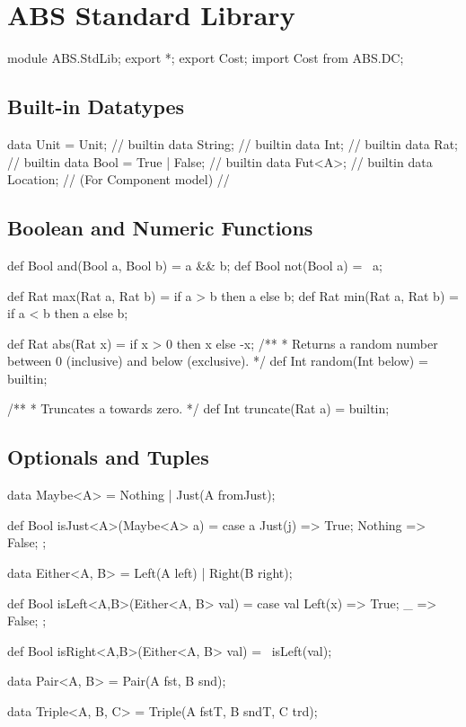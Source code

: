 \chapter{ABS Standard Library}\label{ch:absstdlib}
%


\begin{abscode}
module ABS.StdLib;
export *;
export Cost;
import Cost from ABS.DC;
\end{abscode}

\section{Built-in Datatypes}

\begin{abscode}
data Unit = Unit;               // builtin  
data String;                    // builtin  
data Int;                       // builtin
data Rat;                       // builtin
data Bool = True | False;       // builtin
data Fut<A>;                    // builtin
data Location;                  // (For Component model) //
\end{abscode}

\section{Boolean and Numeric Functions}

\begin{abscode}
def Bool and(Bool a, Bool b) = a && b;
def Bool not(Bool a) = ~a;

def Rat max(Rat a, Rat b) = if a > b then a else b;
def Rat min(Rat a, Rat b) = if a < b then a else b;
    
def Rat abs(Rat x) = if x > 0 then x else -x;
/**
 * Returns a random number between 0 (inclusive) and below (exclusive).
 */
def Int random(Int below) = builtin;

/**
 * Truncates a towards zero.
 */
def Int truncate(Rat a) = builtin;
\end{abscode}

\section{Optionals and Tuples}

\begin{abscode}
data Maybe<A> = Nothing | Just(A fromJust);

def Bool isJust<A>(Maybe<A> a) = 
    case a { Just(j) => True; Nothing => False; };

data Either<A, B> = Left(A left) | Right(B right);

def Bool isLeft<A,B>(Either<A, B> val) = 
    case val { Left(x) => True; _ => False; };
    
def Bool isRight<A,B>(Either<A, B> val) = ~isLeft(val);


data Pair<A, B> = Pair(A fst, B snd); 

data Triple<A, B, C> = Triple(A fstT, B sndT, C trd); 
\end{abscode}

